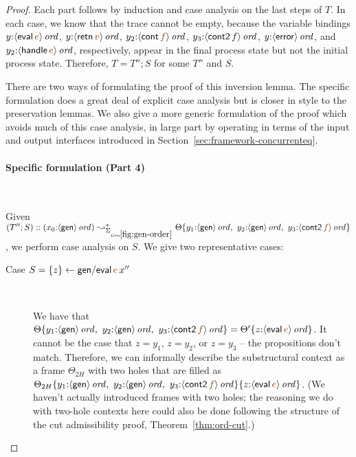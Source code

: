 \begin{proof}
  Each part follows by induction and case analysis on the last steps
  of $T$.  In each case, we know that the trace cannot be empty,
  because the variable bindings $y{:}\istrue{\susp{{\sf
        eval}\,\lf{e}}}$, $y{:}\istrue{\susp{{\sf retn}\,\lf{v}}}$,
  $y_2{:}\istrue{\susp{{\sf cont}\,\lf{f}}}$,
  $y_3{:}{\langle {{\sf cont2}\,f} \rangle}\,{{\it ord}}$, $y{:}{\langle {{\sf
        error}} \rangle}\,{{\it ord}}$, and $y_2{:}\istrue{\susp{{\sf handle}\,\lf{e}}}$,
  respectively, appear in the final process state but not the initial
  process state. Therefore, $T =
  T''; S$ for some $T''$ and $S$. 

  There are two ways of formulating the proof of this inversion lemma.
  The specific formulation does a great deal of explicit case analysis
  but is closer in style to the preservation lemmas. We also give a
  more generic formulation of the proof which avoids much of this case
  analysis, in large part by operating in terms of the input and
  output interfaces introduced in
  Section~\ref{sec:framework-concurrenteq}.

  \paragraph{Specific formulation (Part 4)} ~

   \noindent
   Given $(T''; S) :: (x_0{:}\istrue{\susp{{\sf gen}}})
   \leadsto^*_{\siggenorder} \tackon{\Theta}{y_1{:}\istrue{\susp{{\sf
           gen}}}, ~ y_2{:}\istrue{\susp{{\sf gen}}}, ~
     y_3{:}\istrue{\susp{{\sf cont2}\,\lf{f}}}}$, we perform case
   analysis on $S$. We give two representative cases:

  \begin{description}
  \item[Case $S = \trstep{z}{{\sf gen/eval}\,\lf{e}\,x''}$]~

    We have that $\tackon{\Theta}{y_1{:}\istrue{\susp{{\sf gen}}}, ~
      y_2{:}\istrue{\susp{{\sf gen}}}, ~ y_3{:}\istrue{\susp{{\sf
            cont2}\,\lf{f}}}} = \tackon{\Theta'}{z{:}\istrue{\susp{{\sf
            eval}\,\lf{e}}}}$.  
    It cannot be the case that $z = y_1$, $z = y_2$, or $z = y_3$ --
    the propositions don't match. Therefore, we can informally
    describe the substructural context as a frame $\Theta_{2H}$ with
    two holes that are filled as $\tackon{
      \tackon{\Theta_{2H}} {y_1{:}\istrue{\susp{{\sf gen}}}, ~
        y_2{:}\istrue{\susp{{\sf gen}}}, ~
        y_3{:}\istrue{\susp{{\sf cont2}\,\lf{f}}}}}
    {z{:}\istrue{\susp{{\sf eval}\,\lf{e}}}}$.  (We haven't actually
    introduced frames with two holes; the reasoning we do with
    two-hole contexts here could also be done following the structure of
    the cut admissibility proof, Theorem~\ref{thm:ord-cut}.)


\end{description}
\end{proof}
